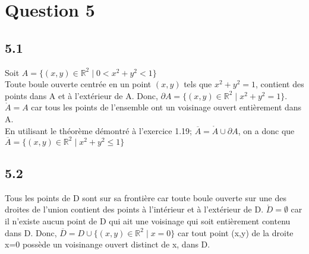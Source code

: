 \documentclass[letterpaper,12pt,oneside,final]{book}
\begin{document}


\newpage
\section*{Question 5}

\subsection*{5.1}
Soit $A = \{(x,y) \in \mathbb{R}^2 \;\vert\; 0 < x^2 + y^2 < 1\}$ \\
Toute boule ouverte centrée en un point $(x,y)$ tels que $x^2+y^2=1$, contient des points dans A et à l'extérieur de A.
Donc, $ \partial A = \{(x,y) \in \mathbb{R}^2 \;\vert\; x^2 + y^2 = 1\}$. \\
$\mathring A=A$ car tous les points de l'ensemble ont un voisinage ouvert entièrement dans A.\\
En utilisant le théorème démontré à  l'exercice 1.19; $\overline{A} = \mathring A \cup \partial A$, on a donc que\\
$\overline{A} = \{(x,y) \in \mathbb{R}^2 \; \vert \; x^2 + y^2 \leq 1\}$



\subsection*{5.2}
Tous les points de D sont sur sa frontière car toute boule ouverte sur une des droites de l'union contient des points à l'intérieur
et à l'extérieur de D.
$\mathring D = \emptyset$ car il n'existe aucun point de D qui ait une voisinage qui soit entièrement contenu dans D.
Donc, $\overline{D} = D \cup \{(x,y)\in \mathbb{R}^2 \; \vert \; x=0\}$ car tout point (x,y) de la droite x=0 possède un voisinange ouvert
distinct de x, dans D.
\end{document}
